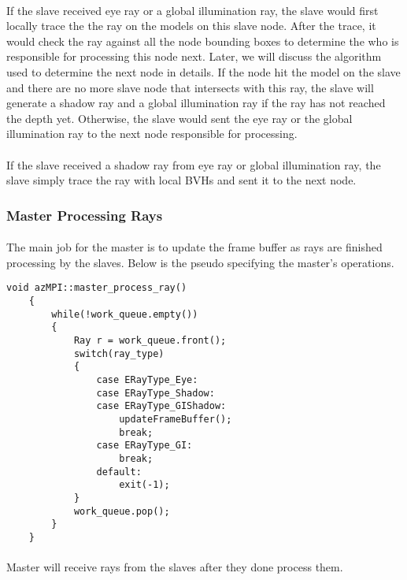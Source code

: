 \documentclass[a4paper, oneside, 10pt]{article}
\begin{document}
\paragraph{} If the slave received eye ray or a global illumination ray, the slave would first locally trace the the ray on the models on this slave node. After the trace, it would check the ray against all the node bounding boxes to determine the who is responsible for processing this node next. Later, we will discuss the algorithm used to determine the next node in details.  If the node hit the model on the slave and there are no more slave node that intersects with this ray, the slave will generate a shadow ray and a global illumination ray if the ray has not reached the depth yet. Otherwise, the slave would sent the eye ray or the global illumination ray to the next node responsible for processing.

\paragraph{} If the slave received a shadow ray from eye ray or global illumination ray, the slave simply trace the ray with local BVHs and sent it to the next node.

\subsubsection{Master Processing Rays}
\paragraph{} The main job for the master is to update the frame buffer as rays are finished processing by the slaves. Below is the pseudo specifying the master's operations.
 \begin{lstlisting}[frame=single] 
    void azMPI::master_process_ray()
    {
        while(!work_queue.empty())
        {
            Ray r = work_queue.front();
            switch(ray_type)
            {
                case ERayType_Eye:
                case ERayType_Shadow:
                case ERayType_GIShadow:
                    updateFrameBuffer();
                    break;
                case ERayType_GI:
                    break;
                default:
                    exit(-1);
            }
            work_queue.pop();
        }
    }
\end{lstlisting}
\paragraph{} Master will receive rays from the slaves after they done process them.
\end{document}
